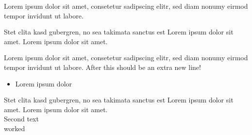 \documentclass[11pt]{article}
\begin{document}
Lorem ipsum dolor sit amet, consetetur sadipscing elitr, sed diam nonumy eirmod tempor invidunt ut labore.

Stet clita kasd gubergren, no sea takimata sanctus est Lorem ipsum dolor sit amet. Lorem ipsum dolor sit amet.


Lorem ipsum dolor sit amet, consetetur sadipscing elitr, sed diam nonumy eirmod tempor invidunt ut labore. After this should be an extra new line!

\begin{itemize}

\item Lorem ipsum dolor

\end{itemize}

Stet clita kasd gubergren, no sea takimata sanctus est Lorem ipsum dolor sit amet. Lorem ipsum dolor sit amet.\\

Second text\\

worked\\
\end{document}
